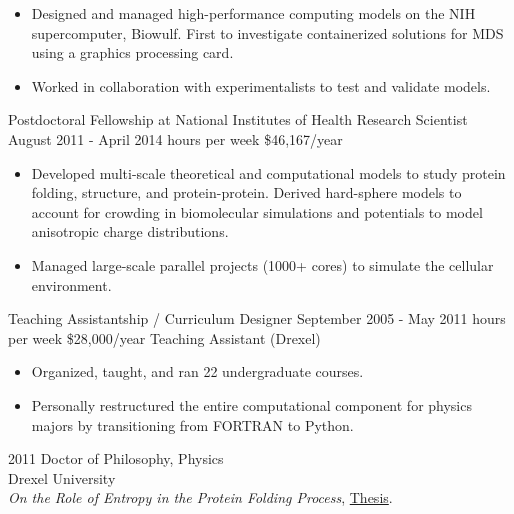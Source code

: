 \documentclass[]{scrartcl}
\begin{document}
\begin{cleanCV}
{\begin{itemize}
  \item Designed and managed high-performance computing models on the NIH supercomputer, Biowulf. First to investigate containerized solutions for MDS using a graphics processing card.

  \item Worked in collaboration with experimentalists to test and validate models. 

  \end{itemize}
}


\WorkExperience
{}
{Postdoctoral Fellowship at National Institutes of Health}
{\newline Research Scientist}
{
  \newline August 2011 - April 2014
   hours per week
  \newline \$46,167/year
}
{
  \begin{itemize}
  \item Developed multi-scale theoretical and computational models to study protein folding, structure, and protein-protein. Derived hard-sphere models to account for crowding in biomolecular simulations and potentials to model anisotropic charge distributions.
  \item Managed large-scale parallel projects (1000+ cores) to simulate the cellular environment.
  \end{itemize}
}

\WorkExperience{}
{\newline Teaching Assistantship / Curriculum Designer}
{
  \newline September 2005 - May 2011
   hours per week
  \newline \$28,000/year
}   
{Teaching Assistant (Drexel)}

{
  \begin{itemize}
  \item   Organized, taught, and ran 22 undergraduate courses.
  \item   Personally restructured the entire computational component for physics majors by transitioning from FORTRAN to Python.
  \end{itemize}
}




\WorkExperience
{2011}
{Doctor of Philosophy, Physics}
{
\\Drexel University
\\\emph{On the Role of Entropy in the Protein Folding Process}, \href{https://idea.library.drexel.edu/islandora/object/idea:3488}{Thesis}.
}


\end{cleanCV}
\end{document}
